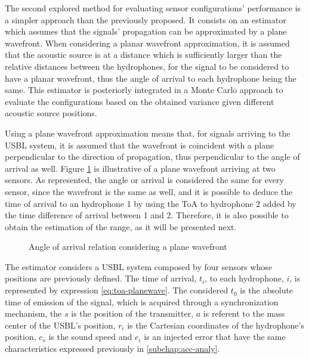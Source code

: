 The second explored method for evaluating sensor configurations' performance is a simpler approach than the previously proposed. It consists on an estimator which assumes that the signals' propagation can be approximated by a plane wavefront. When considering a planar wavefront approximation, it is assumed that the acoustic source is at a distance which is sufficiently larger than the relative distances between the hydrophones, for the signal to be considered to have a planar wavefront, thus the angle of arrival to each hydrophone being the same. This estimator is posteriorly integrated in a Monte Carlo approach to evaluate the configurations based on the obtained variance given different acoustic source positions.

Using a plane wavefront approximation means that, for signals arriving to the USBL system, it is assumed that the wavefront is coincident with a plane perpendicular to the direction of propagation, thus perpendicular to the angle of arrival as well. Figure \ref{fig:plane-wavefront} is illustrative of a plane wavefront arriving at two sensors. As represented, the angle or arrival is considered the same for every sensor, since the wavefront is the same as well, and it is possible to deduce the time of arrival to an hydrophone 1 by using the ToA to hydrophone 2 added by the time difference of arrival between 1 and 2. Therefore, it is also possible to obtain the estimation of the range, as it will be presented next.

\begin{figure}[!htbp]
	\captionsetup{justification=centering,margin=2cm}
	\caption{Angle of arrival relation considering a plane wavefront}
	\label{fig:plane-wavefront}
\end{figure}

The estimator considers a USBL system composed by four sensors whose positions are previously defined. The time of arrival, $t_i$, to each hydrophone, $i$, is represented by expression \ref{eq:toa-planewave}. The considered $t_0$ is the absolute time of emission of the signal, which is acquired through a synchronization mechanism, the $s$ is the position of the transmitter, $a$ is referent to the mass center of the USBL's position, $r_i$ is the Cartesian coordinates of the hydrophone's position, $c_s$ is the sound speed and $e_i$ is an injected error that have the same characteristics expressed previously in \ref{subchap:acc-analy}.

